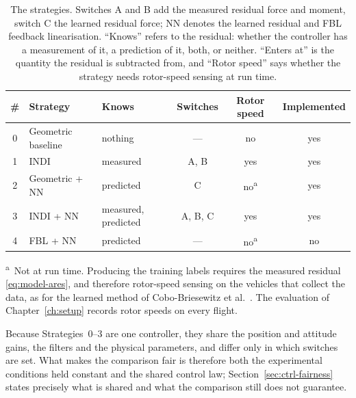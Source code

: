 \begin{table}[t]
  \centering
  \caption{The strategies. Switches A and B add the measured residual force and moment, switch C
    the learned residual force; NN denotes the learned residual and FBL feedback linearisation. ``Knows'' refers to the residual: whether the controller has a
    measurement of it, a prediction of it, both, or neither. ``Enters at'' is the quantity the
    residual is subtracted from, and ``Rotor speed'' says whether the strategy needs rotor-speed
    sensing at run time.}
  \label{tab:ctrl-summary}
  \small
  \begin{tabular}{@{}cllccc@{}}
    \toprule
    \# & Strategy & Knows & Switches & Rotor speed & Implemented \\
    \midrule
    0 & Geometric baseline           & nothing             & ---     & no                      & yes \\
    1 & INDI                         & measured            & A, B    & yes                     & yes \\
    2 & Geometric + NN               & predicted           & C       & no\textsuperscript{a}   & yes \\
    3 & INDI + NN                    & measured, predicted & A, B, C & yes                     & yes \\
    4 & FBL + NN                     & predicted           & ---     & no\textsuperscript{a}   & no \\
    \bottomrule
  \end{tabular}

  \vspace{0.4em}
  \begin{minipage}{0.9\linewidth}\footnotesize
    \textsuperscript{a}~Not at run time. Producing the training labels requires the measured
    residual \eqref{eq:model-ares}, and therefore rotor-speed sensing on the vehicles that collect
    the data, as for the learned method of Cobo-Briesewitz et al.~\cite{cobobriesewitz2026lindi}.
    The evaluation of Chapter~\ref{ch:setup} records rotor speeds on every flight.
  \end{minipage}
\end{table}

Because Strategies~0--3 are one controller, they share the position and attitude gains, the
filters and the physical parameters, and differ only in which switches are set. What makes the
comparison fair is therefore both the experimental conditions held constant and the shared control
law; Section~\ref{sec:ctrl-fairness} states precisely what is shared and what the comparison still
does not guarantee.

